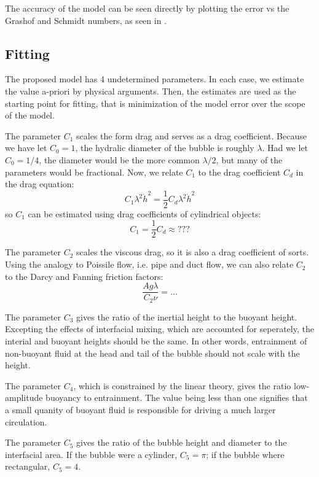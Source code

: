 The accuracy of the model can be seen directly by plotting the error vs the Grashof and Schmidt numbers, as seen in .

\subsection{Fitting}
The proposed model has 4 undetermined parameters.
In each case, we estimate the value a-priori by physical arguments.
Then, the estimates are used as the starting point for fitting, that is minimization of the model error over the scope of the model.

The parameter $C_1$ scales the form drag and serves as a drag coefficient.  
Because we have let $C_0 = 1$, the hydralic diameter of the bubble is roughly $\lambda$.
Had we let $C_0 = 1/4$, the diameter would be the more common $\lambda/2$, but many of the parameters would be fractional.
Now, we relate $C_1$ to the drag coefficient $C_d$ in the drag equation:
\begin{equation}
C_1 \lambda^2 \dot{h}^2 = \frac{1}{2} C_d \lambda^2 \dot{h}^2
\end{equation}
so $C_1$ can be estimated using drag coefficients of cylindrical objects:
\begin{equation}
C_1 = \frac{1}{2} C_d \approx ???
\end{equation}

The parameter $C_2$ scales the viscous drag, so it is also a drag coefficient of sorts.
Using the analogy to Poissile flow, i.e. pipe and duct flow, we can also relate $C_2$ to the Darcy and Fanning friction factors:
\begin{equation}
\frac{A g \lambda}{C_2 \nu} = ...
\end{equation}

The parameter $C_3$ gives the ratio of the inertial height to the buoyant height.
Excepting the effects of interfacial mixing, which are accounted for seperately, the interial and buoyant heights should be the same.
In other words, entrainment of non-buoyant fluid at the head and tail of the bubble should not scale with the height.

The parameter $C_4$, which is constrained by the linear theory, gives the ratio low-amplitude buoyancy to entrainment.
The value being less than one signifies that a small quanity of buoyant fluid is responsible for driving a much larger circulation.

The parameter $C_5$ gives the ratio of the bubble height and diameter to the interfacial area.
If the bubble were a cylinder, $C_5 = \pi$; if the bubble where rectangular, $C_5 = 4$.

